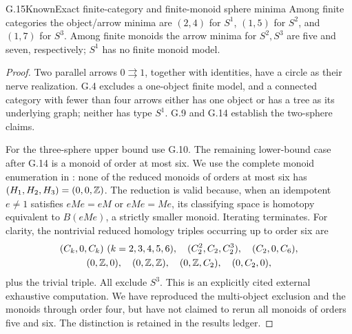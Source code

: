 \begin{claim}{G.15}{Known}{Exact finite-category and finite-monoid sphere minima}
Among finite categories the object/arrow minima are $(2,4)$ for $S^1$, $(1,5)$ for $S^2$, and $(1,7)$ for $S^3$. Among finite monoids the arrow minima for $S^2,S^3$ are five and seven, respectively; $S^1$ has no finite monoid model.
\end{claim}
\begin{proof}
Two parallel arrows $0\rightrightarrows1$, together with identities, have a circle as their nerve realization. G.4 excludes a one-object finite model, and a connected category with fewer than four arrows either has one object or has a tree as its underlying graph; neither has type $S^1$. G.9 and G.14 establish the two-sphere claims.

For the three-sphere upper bound use G.10. The remaining lower-bound case after G.14 is a monoid of order at most six. We use the complete monoid enumeration in \citet[Table 5 and Theorem 2.7, version~2]{Sweeney2026v2}: none of the reduced monoids of orders at most six has $(H_1,H_2,H_3)=(0,0,\mathbb Z)$. The reduction is valid because, when an idempotent $e\ne1$ satisfies $eMe=eM$ or $eMe=Me$, its classifying space is homotopy equivalent to $B(eMe)$, a strictly smaller monoid. Iterating terminates. For clarity, the nontrivial reduced homology triples occurring up to order six are
\[
\begin{gathered}
(C_k,0,C_k)\ (k=2,3,4,5,6),\quad
(C_2^2,C_2,C_2^3),\quad(C_2,0,C_6),\\
(0,\mathbb Z,0),\quad(0,\mathbb Z,\mathbb Z),\quad(0,\mathbb Z,C_2),\quad(0,C_2,0),
\end{gathered}
\]
plus the trivial triple. All exclude $S^3$. This is an explicitly cited external exhaustive computation. We have reproduced the multi-object exclusion and the monoids through order four, but have not claimed to rerun all monoids of orders five and six. The distinction is retained in the results ledger.
\end{proof}

